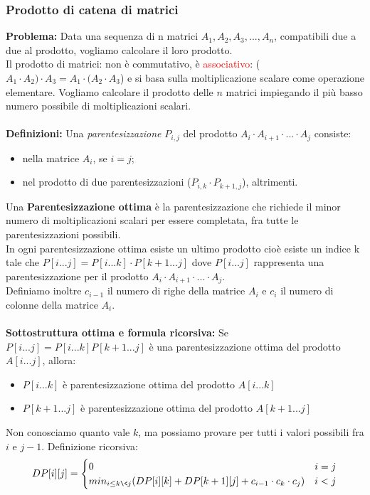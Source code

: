 \documentclass[../cheatSheetAlgoritmi.tex]{subfiles}
\begin{document}
\subsubsection{Prodotto di catena di matrici}
\textbf{Problema:} Data una sequenza di n matrici $A_1, A_2, A_3, ..., A_n$, compatibili due a due al prodotto, vogliamo calcolare il loro prodotto.\\
Il prodotto di matrici: non è commutativo, è \textcolor{red}{associativo}: ($A_1 \cdot A_2) \cdot A_3 = A_1 \cdot (A_2 \cdot A_3$) e si basa sulla moltiplicazione scalare come operazione elementare. Vogliamo calcolare il prodotto delle $n$ matrici impiegando il più basso numero possibile di moltiplicazioni scalari.\\\\
\textbf{Definizioni:} Una \emph{parentesizzazione} $P_{i,j}$ del prodotto $A_i \cdot A_{i+1}\cdot ... \cdot A_j$ consiste:
\begin{itemize}
	\item nella matrice $A_i$, se $i = j$;
	\item nel prodotto di due parentesizzazioni ($P_{i,k} \cdot P_{k+1,j}$), altrimenti.
\end{itemize}
Una \textbf{Parentesizzazione ottima} è la parentesizzazione che richiede il minor numero di moltiplicazioni scalari per essere completata, fra tutte le parentesizzazioni possibili.\\
In ogni parentesizzazione ottima esiste un ultimo prodotto cioè esiste un indice k tale che $P[i...j] = P[i...k] \cdot P[k+1...j]$ dove $P[i...j]$ rappresenta una parentesizzazione per il prodotto $A_i \cdot A_{i+1} \cdot ... \cdot A_j$.\\
Definiamo inoltre $c_{i-1}$ il numero di righe della matrice $A_i$ e $c_{i}$  il numero di colonne della matrice $A_i$.\\\\
\textbf{Sottostruttura ottima e formula ricorsiva:} Se $P[i...j] = P[i...k]P[k+1...j]$ è una parentesizzazione ottima del prodotto $A[i...j]$, allora:
\begin{itemize}
	\item $P[i...k]$ è parentesizzazione ottima del prodotto $A[i...k]$
	\item $P[k+1...j]$ è parentesizzazione ottima del prodotto $A[k+1...j]$
\end{itemize}
Non conosciamo quanto vale $k$, ma possiamo provare per tutti i valori possibili fra $i$ e $j-1$.
Definizione ricorsiva:
\begin{equation*}
  	DP[i][j] =\begin{cases}
    	0 & \text{$i = j$}\\
    	min_{i \leq k \< j}(DP[i][k]+DP[k+1][j]+c_{i-1} \cdot c_{k} \cdot c_{j})  & \text{$i < j$}  
  	\end{cases}
\end{equation*}
\end{document}
